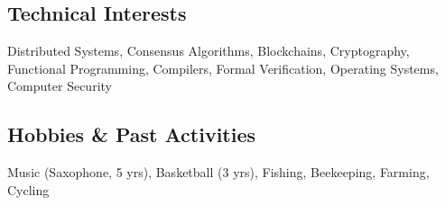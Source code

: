 \documentclass[a4paper,12pt]{article}
\begin{document}
\vspace*{3pt}
\subsection{Technical Interests}
Distributed Systems, Consensus Algorithms, Blockchains, Cryptography, Functional Programming, Compilers, Formal Verification, Operating Systems, Computer Security

\vspace*{3pt}
\subsection{Hobbies \& Past Activities}
Music (Saxophone, 5 yrs), Basketball (3 yrs), Fishing, Beekeeping, Farming, Cycling
\end{document}
